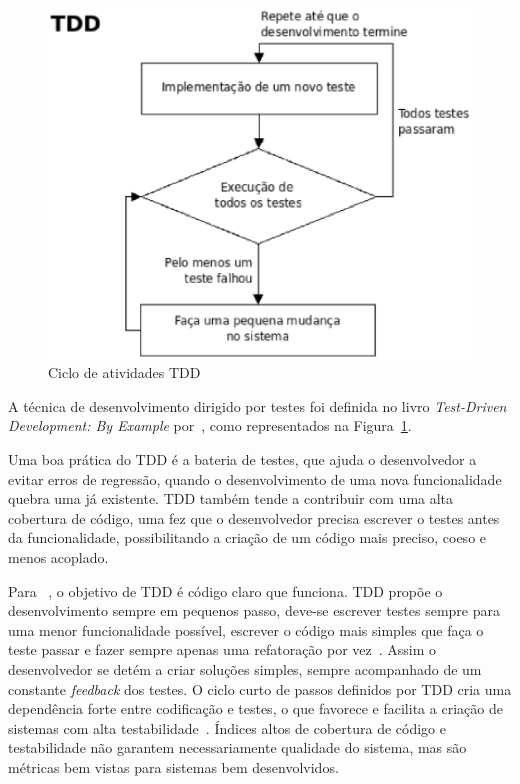 \begin{figure}[h]
    \centering
    \includegraphics[keepaspectratio=true,scale=0.50]
      {figuras/tdd_ciclo.eps}
    \caption{Ciclo de atividades TDD~\cite{beck2002}}
    \label{tdd_ciclo}
\end{figure}

A técnica de desenvolvimento dirigido por testes foi definida no 
livro \textit{Test-Driven Development: By Example} por~, como
representados na Figura~\ref{tdd_ciclo}.

Uma boa prática do TDD é a bateria de testes, que ajuda o desenvolvedor a evitar 
erros de regressão, quando o desenvolvimento de uma nova funcionalidade quebra uma 
já existente.
%
TDD também tende a contribuir com uma alta cobertura de código, uma 
fez que o desenvolvedor precisa escrever o testes antes da funcionalidade, 
possibilitando a criação de um código mais preciso, coeso e menos acoplado. 

Para ~, o objetivo de TDD é código claro que 
funciona.
%
TDD propõe o desenvolvimento sempre em pequenos passo, deve-se escrever testes sempre 
para uma menor funcionalidade possível, escrever o código mais simples que faça o 
teste passar e fazer sempre apenas uma refatoração por vez~\cite{beck2002}. Assim o 
desenvolvedor se detém a criar soluções simples, sempre acompanhado de um constante 
\textit{feedback} dos testes.
%
O ciclo curto de passos definidos por TDD cria uma dependência forte entre codificação 
e testes, o que favorece e facilita a criação de sistemas com alta testabilidade~\cite{bernardo2011}. 
%
Índices altos de cobertura de código e testabilidade não garantem necessariamente 
qualidade do sistema, mas são métricas bem vistas para sistemas bem desenvolvidos.

